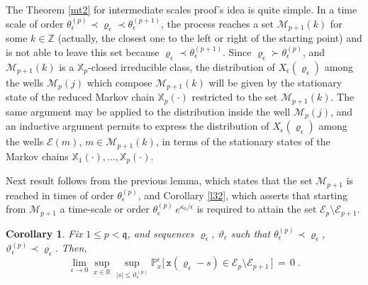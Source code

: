 \documentclass[reqno]{amsart}
\theoremstyle{plain}
\newtheorem{corollary}[theorem]{Corollary}
\theoremstyle{definition}
\newcommand{\mf}[1]{{\mathfrak #1}}
\newcommand{\bb}[1]{{\mathbb #1}}
\newcommand{\ms}[1]{{\mathscr #1}}
\newcommand{\mtt}[1]{{\mathtt #1}}
\newcounter{as}[section]
\newcommand{\<}{\langle}
\renewcommand{\>}{\rangle}
\begin{document}
The Theorem \ref{mt2} for intermediate scales proof's idea is quite
simple. In a time scale of order
$\theta^{(p)}_\epsilon \prec \varrho_\epsilon \prec
\theta^{(p+1)}_\epsilon$, the process reaches a set $\ms M_{p+1}(k)$
for some $k\in\bb Z$ (actually, the closest one to the left or right
of the starting point) and is not able to leave this set because
$\varrho_\epsilon \prec \theta^{(p+1)}_\epsilon$. Since
$\varrho_\epsilon \succ \theta^{(p)}_\epsilon$, and $\ms M_{p+1}(k)$
is a $\bb X_p$-closed irreducible class, the distribution of
$X_\epsilon(\varrho_\epsilon)$ among the wells $\ms M_p(j)$ which
compose $\ms M_{p+1}(k)$ will be given by the stationary state of the
reduced Markov chain $\bb X_p(\cdot)$ restricted to the set
$\ms M_{p+1}(k)$. The same argument may be applied to the distribution
inside the well $\ms M_{p}(j)$, and an inductive argument permits to
express the distribution of $X_\epsilon(\varrho_\epsilon)$ among the
wells $\ms E(m)$, $m\in \ms M_{p+1}(k)$, in terms of the stationary
states of the Markov chains $\bb X_1(\cdot), \dots, \bb X_p(\cdot)$.

Next result follows from the previous lemma, which states that the set
$\ms M_{p+1}$ is reached in times of order $\theta^{(p)}_\epsilon$,
and Corollary \ref{l32}, which asserts that starting from
$\ms M_{p+1}$ a time-scale or order
$\theta^{(p)}_\epsilon\, e^{\kappa_0/\epsilon}$ is required to attain
the set $\ms E_p \setminus \ms E_{p+1}$.

\begin{corollary}
\label{l41}
Fix $1\le p< \mf q$, and sequences $\varrho_\epsilon$,
$\vartheta_\epsilon$ such that
$\theta^{(p)}_\epsilon \prec \varrho_\epsilon$,
$\vartheta^{(p)}_\epsilon\prec \varrho_\epsilon$.  Then,
\begin{equation*}
\lim_{\epsilon\to 0} \sup_{x\in \bb R}
\sup_{|s| \le \vartheta^{(p)}_\epsilon}
\bb P^{\epsilon}_x\big[ \, 
\mtt x(\varrho_\epsilon - s) \in \ms E_p
\setminus \ms E_{p+1} \,\big] \,=\, 0 \;.
\end{equation*}
\end{corollary}
\end{document}
